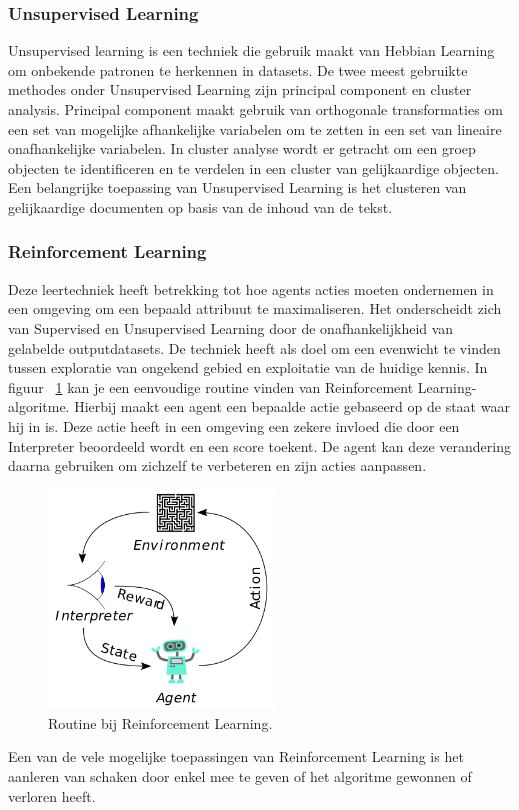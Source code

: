 	\subsubsection{Unsupervised Learning} Unsupervised learning is een techniek die gebruik maakt van Hebbian Learning om onbekende patronen te herkennen in datasets. De twee meest gebruikte methodes onder Unsupervised Learning zijn principal component en cluster analysis. Principal component maakt gebruik van orthogonale transformaties om een set van mogelijke afhankelijke variabelen om te zetten in een set van lineaire onafhankelijke variabelen. In cluster analyse wordt er getracht om een groep objecten te identificeren en te verdelen in een cluster van gelijkaardige objecten. 
	Een belangrijke toepassing van Unsupervised Learning is het clusteren van gelijkaardige documenten op basis van de inhoud van de tekst.
	
	
	\subsubsection{Reinforcement Learning} Deze leertechniek heeft betrekking tot hoe agents acties moeten ondernemen in een omgeving om een bepaald attribuut te maximaliseren. Het onderscheidt zich van Supervised en Unsupervised Learning door de onafhankelijkheid van gelabelde outputdatasets. De techniek heeft als doel om een evenwicht te vinden tussen exploratie van ongekend gebied en exploitatie van de huidige kennis. In figuur ~\ref{fig:reinforcemntLearning} kan je een eenvoudige routine vinden van Reinforcement Learning-algoritme. Hierbij maakt een agent een bepaalde actie gebaseerd op de staat waar hij in is. Deze actie heeft in een omgeving een zekere invloed die door een Interpreter beoordeeld wordt en een score toekent. De agent kan deze verandering daarna gebruiken om zichzelf te verbeteren en zijn acties aanpassen. 
	\begin{figure}
		\centering
		\includegraphics[width=60mm]{afbeeldingen/Reinforcement_learning_diagram.PNG}
		\caption{Routine bij Reinforcement Learning\cite{bron:reinforcementlearning}.}
		\label{fig:reinforcemntLearning}
	\end{figure}
	Een van de vele mogelijke toepassingen van Reinforcement Learning is het aanleren van schaken door enkel mee te geven of het algoritme gewonnen of verloren heeft. 
	

